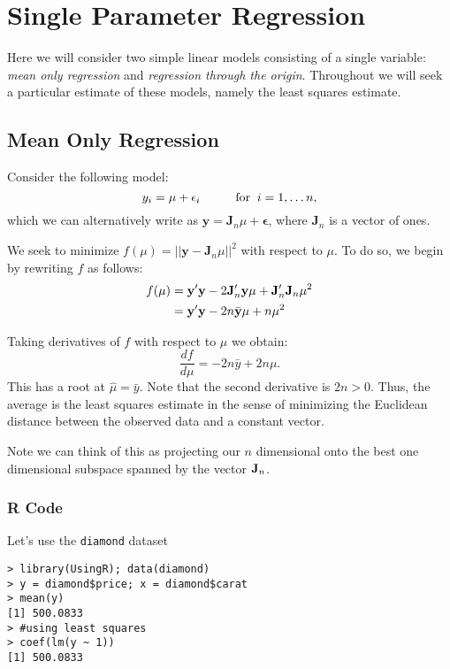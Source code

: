 \section{Single Parameter Regression}

Here we will consider two simple linear models consisting of a single variable: {\it mean only regression} and {\it regression through the origin}. Throughout we will seek a particular estimate of these models, namely the least squares estimate. 


\subsection{Mean Only Regression}
Consider the following model:
$$
y_i = \mu + \epsilon_i  \hskip1cm {\mbox{for}} \; \;  i = 1,\ldots n,
$$
which we can alternatively write as ${\mathbf y} = {\mathbf J}_n \mu + {\mathbf \epsilon}$, where $ {\mathbf J}_n$ is a vector of ones. 

\vb
We seek to minimize $f(\mu) = || {\mathbf y} - {\mathbf J}_n \mu ||^2$ with respect to $\mu$.
To do so, we begin by rewriting $f$ as follows:
\begin{eqnarray}
f(\mu) &= \mathbf{y}' \mathbf{y} - 2{\mathbf J}_n' \mathbf{y} \mu  + {\mathbf J}_n' {\mathbf J}_n \mu^2 \nonumber \\
& =  \mathbf{y}' \mathbf{y} - 2n {\bar {\mathbf{y}}} \mu  +  n \mu^2 \nonumber
\end{eqnarray}

Taking derivatives of $f$ with respect to $\mu$ we obtain:
$$
\frac{df}{d \mu} = -2n{\bar y} + 2n \mu.
$$
This has a root at ${\hat \mu}= {\bar y}$. Note that the second derivative is $2n > 0$. Thus, the average is
the least squares estimate in the sense of minimizing the Euclidean distance between the
observed data and a constant vector. 

\vb
Note we can think of this as projecting our $n$ dimensional
onto the best one dimensional subspace spanned by the vector $\mathbf{J}_n$. 

\subsubsection{R Code}

Let's use the \texttt{diamond} dataset 
\begin{verbatim}
> library(UsingR); data(diamond)
> y = diamond$price; x = diamond$carat
> mean(y)
[1] 500.0833
> #using least squares
> coef(lm(y ~ 1))
[1] 500.0833
\end{verbatim}

